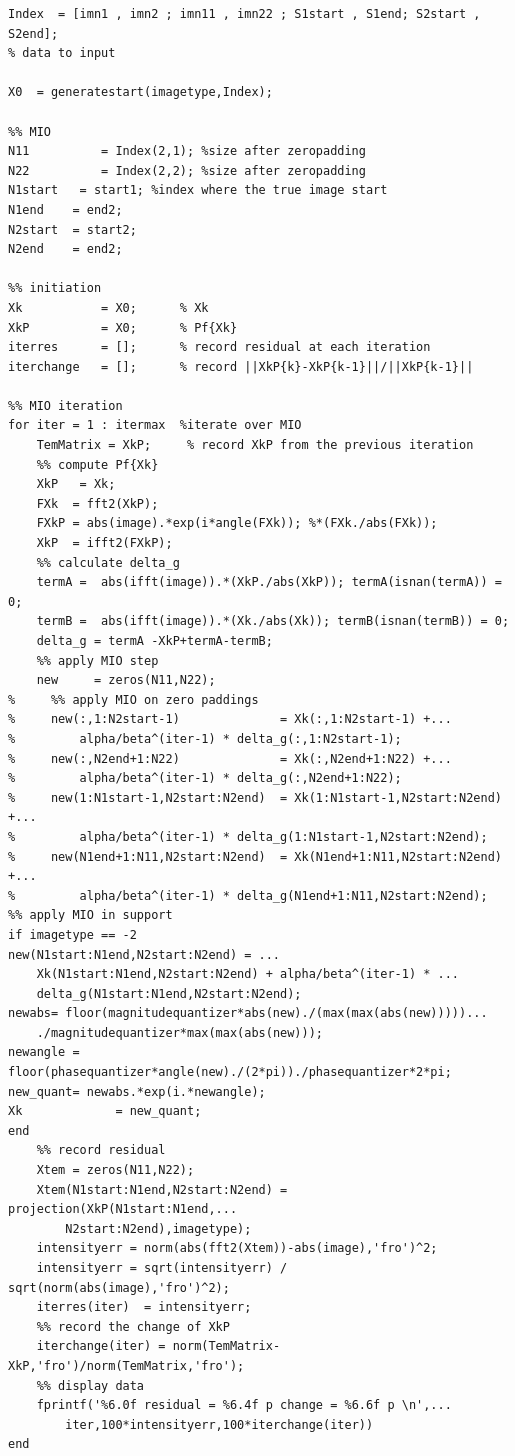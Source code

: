 \documentclass[letter,14pt]{extreport}
\begin{document}
\begin{appendices}
\begin{lstlisting}
Index  = [imn1 , imn2 ; imn11 , imn22 ; S1start , S1end; S2start , S2end];
% data to input

X0  = generatestart(imagetype,Index);

%% MIO  
N11          = Index(2,1); %size after zeropadding
N22          = Index(2,2); %size after zeropadding
N1start   = start1; %index where the true image start
N1end    = end2;
N2start  = start2;
N2end    = end2;

%% initiation
Xk           = X0;      % Xk
XkP          = X0;      % Pf{Xk}
iterres      = [];      % record residual at each iteration
iterchange   = [];      % record ||XkP{k}-XkP{k-1}||/||XkP{k-1}||

%% MIO iteration
for iter = 1 : itermax  %iterate over MIO
    TemMatrix = XkP;     % record XkP from the previous iteration
    %% compute Pf{Xk}
    XkP   = Xk;
    FXk  = fft2(XkP);
    FXkP = abs(image).*exp(i*angle(FXk)); %*(FXk./abs(FXk));
    XkP  = ifft2(FXkP);
    %% calculate delta_g
    termA =  abs(ifft(image)).*(XkP./abs(XkP)); termA(isnan(termA)) = 0;
    termB =  abs(ifft(image)).*(Xk./abs(Xk)); termB(isnan(termB)) = 0;
    delta_g = termA -XkP+termA-termB;
    %% apply MIO step
    new     = zeros(N11,N22);
%     %% apply MIO on zero paddings
%     new(:,1:N2start-1)              = Xk(:,1:N2start-1) +...
%         alpha/beta^(iter-1) * delta_g(:,1:N2start-1);
%     new(:,N2end+1:N22)              = Xk(:,N2end+1:N22) +...
%         alpha/beta^(iter-1) * delta_g(:,N2end+1:N22);
%     new(1:N1start-1,N2start:N2end)  = Xk(1:N1start-1,N2start:N2end) +...
%         alpha/beta^(iter-1) * delta_g(1:N1start-1,N2start:N2end);
%     new(N1end+1:N11,N2start:N2end)  = Xk(N1end+1:N11,N2start:N2end) +...
%         alpha/beta^(iter-1) * delta_g(N1end+1:N11,N2start:N2end);
%% apply MIO in support
if imagetype == -2
new(N1start:N1end,N2start:N2end) = ...
    Xk(N1start:N1end,N2start:N2end) + alpha/beta^(iter-1) * ...
    delta_g(N1start:N1end,N2start:N2end);
newabs= floor(magnitudequantizer*abs(new)./(max(max(abs(new)))))...
    ./magnitudequantizer*max(max(abs(new)));
newangle = floor(phasequantizer*angle(new)./(2*pi))./phasequantizer*2*pi;
new_quant= newabs.*exp(i.*newangle);
Xk             = new_quant;
end
    %% record residual
    Xtem = zeros(N11,N22);
    Xtem(N1start:N1end,N2start:N2end) = projection(XkP(N1start:N1end,...
        N2start:N2end),imagetype);
    intensityerr = norm(abs(fft2(Xtem))-abs(image),'fro')^2;
    intensityerr = sqrt(intensityerr) / sqrt(norm(abs(image),'fro')^2);
    iterres(iter)  = intensityerr;
    %% record the change of XkP
    iterchange(iter) = norm(TemMatrix-XkP,'fro')/norm(TemMatrix,'fro');
    %% display data
    fprintf('%6.0f residual = %6.4f p change = %6.6f p \n',...
        iter,100*intensityerr,100*iterchange(iter))
end


\end{lstlisting}
\end{appendices}
\end{document}

